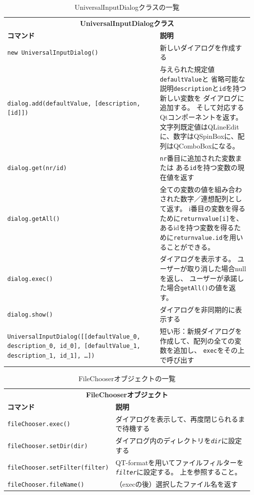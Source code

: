 \begin{table}[H]
  \centering
  \caption{UniversalInputDialogクラスの一覧}
  \begin{tabularx}{\linewidth}{XX}
    \hline
    \multicolumn{2}{c}{\textbf{UniversalInputDialogクラス}}\\
    \textbf{コマンド} & \textbf{説明}\\
    \hline
    \texttt{new UniversalInputDialog()} & 新しいダイアログを作成する\\
    \texttt{dialog.add(defaultValue, {[}description, {[}id{]}{]})}
      & 与えられた規定値\texttt{defaultValue}と
      省略可能な説明\texttt{description}と\texttt{id}を持つ新しい変数を
      ダイアログに追加する。
      そして対応するQtコンポーネントを返す。\newline
      文字列既定値はQLineEditに、数字はQSpinBoxに、配列はQComboBoxになる。\\
    \texttt{dialog.get(nr/id)}
      & \texttt{nr}番目に追加された変数または
      ある\texttt{id}を持つ変数の現在値を返す\\
    \texttt{dialog.getAll()}
      & 全ての変数の値を組み合わされた数字／連想配列として返す。
      i番目の変数を得るために\texttt{returnvalue{[}i{]}}を、
      あるidを持つ変数を得るために\texttt{returnvalue.id}を用いることができる。\\
    \texttt{dialog.exec()}
      & ダイアログを表示する。
      ユーザーが取り消した場合nullを返し、
      ユーザーが承諾した場合\texttt{getAll()}の値を返す。\\
    \texttt{dialog.show()} & ダイアログを非同期的に表示する\\
    \texttt{UniversalInputDialog({[}{[}defaultValue\_0, description\_0, id\_0{]}, {[}defaultValue\_1, description\_1, id\_1{]}, \ldots{}{]})}
      & 短い形：新規ダイアログを作成して、配列の全ての変数を追加し、
      \texttt{exec}をその上で呼び出す\\
    \hline
  \end{tabularx}
\end{table}

\begin{table}[H]
  \centering
  \caption{FileChooserオブジェクトの一覧}
  \begin{tabularx}{\linewidth}{XX}
    \hline
    \multicolumn{2}{c}{\textbf{FileChooserオブジェクト}}\\
    \textbf{コマンド} & \textbf{説明}\\
    \hline
    \texttt{fileChooser.exec()} & ダイアログを表示して、再度閉じられるまで待機する\\
    \texttt{fileChooser.setDir(dir)}
      & ダイアログ内のディレクトリを\texttt{\emph{dir}}に設定する\\
    \texttt{fileChooser.setFilter(filter)}
      & QT-formatを用いてファイルフィルターを\texttt{\emph{filter}}に設定する。
      上を参照すること。\\
    \texttt{fileChooser.fileName()} & （execの後）選択したファイル名を返す\\
    \hline
  \end{tabularx}
\end{table}

